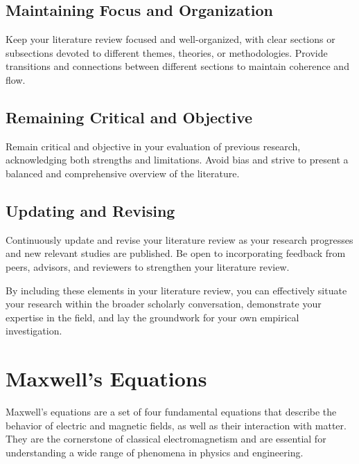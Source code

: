 \subsection{Maintaining Focus and Organization}
Keep your literature review focused and well-organized, with clear sections or subsections devoted to different themes, theories, or methodologies.
Provide transitions and connections between different sections to maintain coherence and flow.

\subsection{Remaining Critical and Objective}
Remain critical and objective in your evaluation of previous research, acknowledging both strengths and limitations.
Avoid bias and strive to present a balanced and comprehensive overview of the literature.

\subsection{Updating and Revising}
Continuously update and revise your literature review as your research progresses and new relevant studies are published.
Be open to incorporating feedback from peers, advisors, and reviewers to strengthen your literature review.

By including these elements in your literature review, you can effectively situate your research within the broader scholarly conversation, demonstrate your expertise in the field, and lay the groundwork for your own empirical investigation.


\section{Maxwell's Equations}
Maxwell's equations are a set of four fundamental equations that describe the behavior of electric and magnetic fields, as well as their interaction with matter.
They are the cornerstone of classical electromagnetism and are essential for understanding a wide range of phenomena in physics and engineering.

